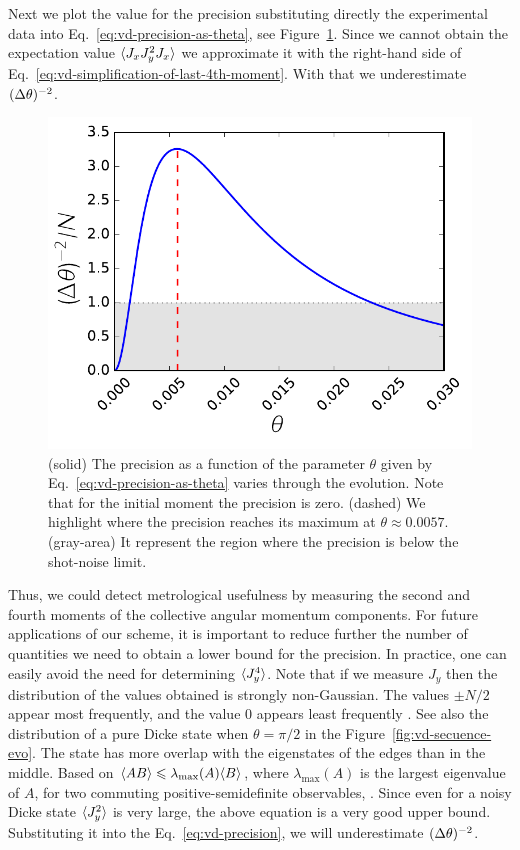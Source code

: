 Next we plot the value for the precision substituting directly the experimental data into Eq.~\eqref{eq:vd-precision-as-theta}, see Figure~\ref{fig:vd-precision-theta-experiment}.
Since we cannot obtain the expectation value $\langle{J_xJ_y^2J_x}\rangle$ we approximate it with the right-hand side of Eq.~\eqref{eq:vd-simplification-of-last-4th-moment}.
With that we underestimate $(\Delta \theta )^{-2}$.
\begin{figure}[htp]
  \centering
  \includegraphics[scale=.65]{img/VD_precision_theta.pdf}
  \caption[Evolution in $\theta$ of the precision.]{
  (solid) The precision as a function of the parameter $\theta$ given by Eq.~\eqref{eq:vd-precision-as-theta} varies through the evolution.
  Note that for the initial moment the precision is zero.
  (dashed) We highlight where the precision reaches its maximum at $\theta \approx 0.0057$.
  (gray-area) It represent the region where the precision is below the shot-noise limit.}
  \label{fig:vd-precision-theta-experiment}
\end{figure}

Thus, we could detect metrological usefulness by measuring the second and fourth moments of the collective angular momentum components.
For future applications of our scheme, it is important to reduce further the number of quantities we need to obtain a lower bound for the precision.
In practice, one can easily avoid the need for determining $\langle{J_y^4}\rangle$.
Note that if we measure $J_y$ then the distribution of the values obtained is strongly non-Gaussian.
The values $\pm N/2$ appear most frequently, and the value 0 appears least frequently \cite{Luecke2011}.
See also the distribution of a pure Dicke state when $\theta=\pi/2$ in the Figure~\ref{fig:vd-secuence-evo}.
The state has more overlap with the eigenstates of the edges than in the middle.
Based on $\langle{AB}\rangle\leqslant\lambda_{\max}(A)\langle{B}\rangle$, where $\lambda_{\max}(A)$ is the largest eigenvalue of $A$, for two commuting positive-semidefinite observables,
\be
  \leqslant{}.
\ee
Since even for a noisy Dicke state $\langle{J_y^2}\rangle$ is very large, the above equation is a very good upper bound.
Substituting it into the Eq.~\eqref{eq:vd-precision}, we will underestimate $(\Delta \theta )^{-2}$.

